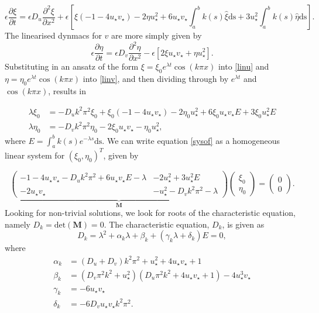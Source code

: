 \documentclass[12pt]{report}
\begin{document}
\begin{equation}\label{linu}
  \epsilon \frac{\partial \xi}{\partial t}=\epsilon D_u\frac{\partial^2\xi}{\partial x^2}+\epsilon\left[\xi(-1-4u_\star v_\star)-2\eta u_\star^2 +6u_\star v_\star\int_a^bk(s)\hat{\xi}\text{ds}+3u_\star^2\int_a^bk(s)\hat{\eta}\text{ds}\right].
\end{equation}
The linearised dynmacs for $v$ are more simply given by
\begin{equation}\label{linv}
\epsilon \frac{\partial\eta}{\partial t}=\epsilon D_v\frac{\partial^2\eta}{\partial x^2}-\epsilon\left[2\xi u_\star v_\star+\eta u_\star^2\right].
\end{equation}
Substituting in an ansatz of the form $\xi=\xi_0e^{\lambda t}\cos(k\pi x)$ \cite{yigaffneyli} into \eqref{linu} and $\eta=\eta_0e^{\lambda t}\cos(k\pi x)$ into \eqref{linv}, and then dividing through by $e^{\lambda t}$ and $\cos(k\pi x)$, results in

\begin{equation}\label{sysof}
  \begin{split}
\lambda\xi_0&=-D_uk^2\pi^2\xi_0+\xi_0(-1-4u_\star v_\star)-2\eta_0u_\star^2+6\xi_0u_\star v_\star E+3\xi_0u_\star^2E \\
\lambda\eta_0&=-D_vk^2\pi^2\eta_0-2\xi_0u_\star v_\star-\eta_0u_\star^2,
\end{split}
\end{equation}
where $E=\int_a^bk(s)e^{-\lambda s}\text{ds}$. We can write equation \eqref{sysof} as a homogeneous linear system for $(\xi_0,\eta_0)^T$, given by

\begin{equation}
\underbrace{\begin{pmatrix}-1-4u_\star v_\star-D_uk^2\pi^2+6u_\star v_\star E-\lambda&-2u_\star^2+3u_\star^2E\\-2u_\star v_\star&-u_\star^2-D_vk^2\pi^2-\lambda \end{pmatrix}}_{\textbf{M}}\begin{pmatrix}\xi_0\\\eta_0\end{pmatrix}=\begin{pmatrix}0\\0\end{pmatrix}.
\end{equation}
Looking for non-trivial solutions, we look for roots of the characteristic equation, namely $D_k=\text{det}(\textbf{M})=0$. The characteristic equation, $D_k$, is given as
\begin{equation}\label{characdist}
  D_k=\lambda^2+\alpha_k\lambda+\beta_k+(\gamma_k\lambda+\delta_k)E=0,
\end{equation}
where
\begin{align}
\alpha_k&=(D_u+D_v)k^2\pi^2+u_\star^2+4u_\star v_\star+1\\
\beta_k&=(D_v\pi^2k^2+u_\star^2)(D_u\pi^2k^2+4u_\star v_\star+1)-4u_\star^3v_\star\\
\gamma_k&=-6u_\star v_\star\\
\delta_k&=-6D_vu_\star v_\star k^2\pi^2.
\end{align}
\end{document}
